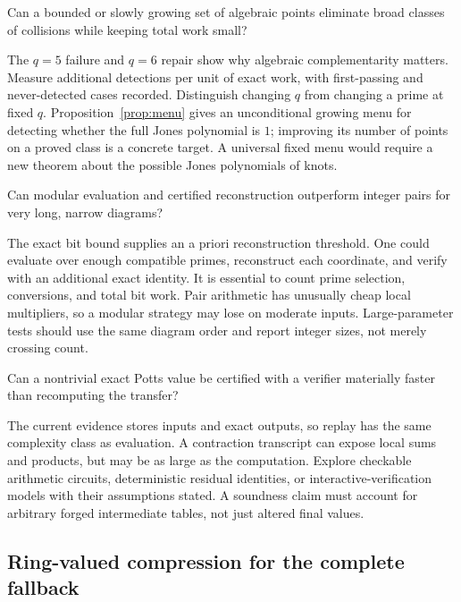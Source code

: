 \begin{question}
Can a bounded or slowly growing set of algebraic points eliminate broad
classes of collisions while keeping total work small?
\end{question}

The $q=5$ failure and $q=6$ repair show why algebraic complementarity matters.
Measure additional detections per unit of exact work, with first-passing
and never-detected cases recorded. Distinguish changing $q$ from changing a
prime at fixed $q$. Proposition~\ref{prop:menu} gives an unconditional
growing menu for detecting whether the full Jones polynomial is $1$;
improving its number of points on a proved class is a concrete target.
A universal fixed menu would require a new theorem about the possible
Jones polynomials of knots.

\begin{question}
Can modular evaluation and certified reconstruction outperform integer
pairs for very long, narrow diagrams?
\end{question}

The exact bit bound supplies an a priori reconstruction threshold.
One could evaluate over enough compatible primes, reconstruct each
coordinate, and verify with an additional exact identity. It is essential
to count prime selection, conversions, and total bit work. Pair arithmetic
has unusually cheap local multipliers, so a modular strategy may lose on
moderate inputs. Large-parameter tests should use the same diagram order
and report integer sizes, not merely crossing count.

\begin{question}
Can a nontrivial exact Potts value be certified with a verifier materially
faster than recomputing the transfer?
\end{question}

The current evidence stores inputs and exact outputs, so replay has the
same complexity class as evaluation. A contraction transcript can expose
local sums and products, but may be as large as the computation.
Explore checkable arithmetic circuits, deterministic residual identities,
or interactive-verification models with their assumptions stated.
A soundness claim must account for arbitrary forged intermediate tables,
not just altered final values.

\subsection{Ring-valued compression for the complete fallback}

